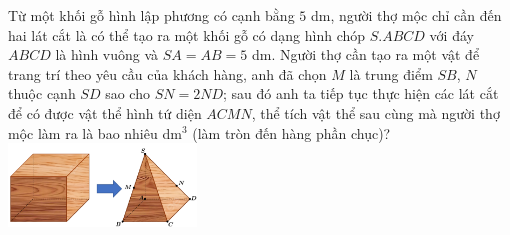 \begin{ex}%
\immini
{
    Từ một khối gỗ hình lập phương có cạnh bằng $5$ dm, người thợ mộc chỉ cần đến hai lát cắt là có thể tạo ra một khối gỗ có dạng hình chóp $S.ABCD$ với đáy $ABCD$ là hình vuông và $SA=AB=5$ dm. Người thợ cần tạo ra một vật để trang trí theo yêu cầu của khách hàng, anh đã chọn $M$ là trung điểm $SB$, $N$ thuộc cạnh $SD$ sao cho $SN=2ND$; sau đó anh ta tiếp tục thực hiện các lát cắt để có được vật thể hình tứ diện $ACMN$, thể tích vật thể sau cùng mà người thợ mộc làm ra là bao nhiêu dm$^3$ (làm tròn đến hàng phần chục)?
}
{
    \includegraphics[width=5cm]{img/HXN-2-17}
}
    \end{ex}
    

